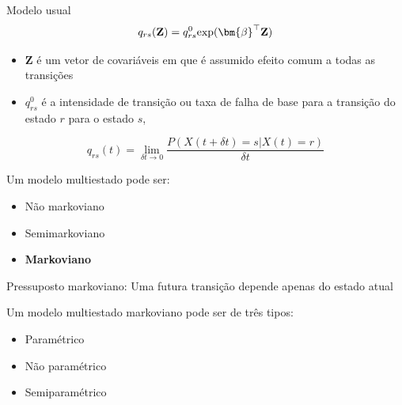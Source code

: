 \begin{frame}

\begin{block}{Modelo usual}
 \pause \[q_{rs}(\mathbf{Z}) =
          q_{rs}^{0}{\rm exp}(\bm{\beta}^{\top}\mathbf{Z})\]
 \begin{itemize}
  \pause \item \(\mathbf{Z}\) é um vetor de covariáveis em que é assumido
               efeito comum a todas as transições
\vspace{.3cm}
  \pause \item \(q_{rs}^{0}\) é a intensidade de transição ou taxa de falha
               de base para a transição do estado \(r\) para o estado \(s\),
 \end{itemize}
 \vspace{.3cm} \pause
 \[q_{rs}(t) = \lim_{\delta t \to 0}
               \frac{P(X(t + \delta t) = s | X(t) = r)}{\delta t}\]
\end{block}

\end{frame}

\begin{frame}

\begin{block}{Um modelo multiestado pode ser:}
\vspace{-.15cm}
 \begin{multicols}{3}
 \small
  \begin{itemize}
   \pause \item Não markoviano
   \pause \item Semimarkoviano
   \pause \item \textbf{Markoviano}
  \end{itemize}
 \end{multicols}
\end{block}

\vspace{.3cm}

\pause

\begin{block}{Pressuposto markoviano:}
 \pause Uma futura transição depende apenas do estado atual
\end{block}

\vspace{.3cm}

\pause

\begin{block}{Um modelo multiestado markoviano pode ser de três tipos:}
\vspace{-.15cm}
 \begin{multicols}{3}
 \small
  \begin{itemize}
   \pause \item Paramétrico
   \pause \item Não paramétrico
   \pause \item Semiparamétrico
  \end{itemize}
 \end{multicols}
\end{block}

\end{frame}

